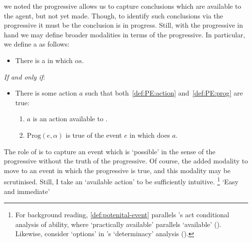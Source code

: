 \begin{note}
  we noted the progressive allows us to capture conclusions which are available to the agent, but not yet made.
  Though, to identify such conclusions via the progressive it must be the conclusion is in progress.
  Still, with the progressive in hand we may define broader modalities in terms of the progressive.
  In particular, we define a \pevent{} as follows:

  \begin{definition}[\pevent{3}]
    \label{def:potenital-event}

    \begin{itemize}
    \item
      There is a \emph{\pevent{}} in which \vAgent{} \(\alpha\)s.
    \end{itemize}

    \emph{If and only if}:

    \begin{itemize}
    \item
      There is some action \(a\) such that both~\ref{def:PE:action} and~\ref{def:PE:prog} are true:

      \begin{enumerate}[label=\alph*., ref=(\alph*)]
      \item
        \label{def:PE:action}
        \(a\) is an action available to \vAgent{}.
      \item
        \label{def:PE:prog}
        \(\text{Prog}(e, \alpha)\) is true of the event \(e\) in which \vAgent{} does \(a\).
      \end{enumerate}
    \end{itemize}
    \vspace{-\baselineskip}
  \end{definition}

  The role of  is to capture an event which is `possible' in the sense of the progressive without the truth of the progressive.
  Of course, the added modality to move to an event in which the progressive is true, and this modality may be scrutinised.
  Still, I take an `available action' to be sufficiently intuitive.%
  \footnote{
    For background reading, \autoref{def:potenital-event} parallels \citeauthor{Mandelkern:2017aa}'s act conditional analysis of ability, where `practically available' parallels `available' (\citeyear[\S5]{Mandelkern:2017aa}).
    Likewise, consider `options' in \citeauthor{Boylan:2020aa}'s `determinacy' analysis (\citeyear[\S4]{Boylan:2020aa}).
  }
  {
    \color{red}
    `Easy and immediate'
  }
\end{note}

